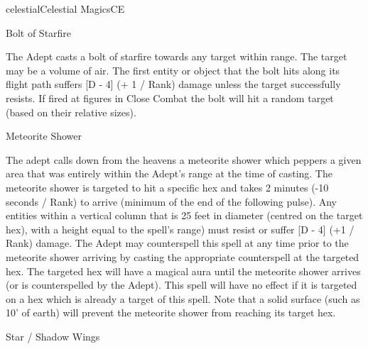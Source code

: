 \begin{College}[1.3]{celestial}{Celestial Magics}{CE}
\begin{spell}[S-3]{Bolt of Starfire}

\begin{effects}
The Adept casts a bolt of starfire towards any target within range.
The target may be a volume of air.  The first entity or object that
the bolt hits along its flight path suffers [D - 4] (+ 1 / Rank)
damage unless the target successfully resists.  If fired at figures in
Close Combat the bolt will hit a random target (based on their
relative sizes).
\end{effects}
\end{spell}

\begin{spell}[S-4]{Meteorite Shower}

\begin{effects}
The adept calls down from the heavens a meteorite shower which peppers
a given area that was entirely within the Adept’s range at the time of
casting.  The meteorite shower is targeted to hit a specific hex and
takes 2 minutes (-10 seconds / Rank) to arrive (minimum of the end of
the following pulse).  Any entities within a vertical column that is
25 feet in diameter (centred on the target hex), with a height equal
to the spell’s range) must resist or suffer [D - 4] (+1 / Rank)
damage.  The Adept may counterspell this spell at any time prior to
the meteorite shower arriving by casting the appropriate counterspell
at the targeted hex.  The targeted hex will have a magical aura until
the meteorite shower arrives (or is counterspelled by the Adept).
This spell will have no effect if it is targeted on a hex which is
already a target of this spell.  Note that a solid surface (such as
10’ of earth) will prevent the meteorite shower from reaching its
target hex.
\end{effects}
\end{spell}

\begin{spell}[S-5]{Star / Shadow Wings}


\end{spell}
\end{College}
